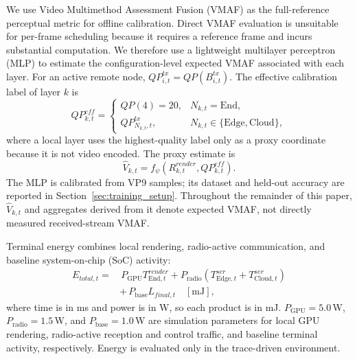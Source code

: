 \documentclass[10pt,journal,compsoc]{IEEEtran}
\begin{document}
We use Video Multimethod Assessment Fusion (VMAF) as the full-reference perceptual metric for offline calibration. Direct VMAF evaluation is unsuitable for per-frame scheduling because it requires a reference frame and incurs substantial computation. We therefore use a lightweight multilayer perceptron (MLP) to estimate the configuration-level expected VMAF associated with each layer. For an active remote node, $QP^{tx}_{i,t}=QP(B^{tx}_{i,t})$. The effective calibration label of layer $k$ is
\begin{equation}
	QP^{eff}_{k,t}=\begin{cases}
		QP(4)=20, & N_{k,t}=\mathrm{End},\\
		QP^{tx}_{N_{k,t},t}, & N_{k,t}\in\{\mathrm{Edge},\mathrm{Cloud}\},
	\end{cases}
	\label{eq:effective_qp}
\end{equation}
where a local layer uses the highest-quality label only as a proxy coordinate because it is not video encoded. The proxy estimate is
\begin{equation}
	\widehat V_{k,t}=f_{\psi}\!\left(R^{render}_{k,t},QP^{eff}_{k,t}\right).
	\label{eq:vmaf_proxy}
\end{equation}
The MLP is calibrated from VP9 samples; its dataset and held-out accuracy are reported in Section~\ref{sec:training_setup}. Throughout the remainder of this paper, $\widehat V_{k,t}$ and aggregates derived from it denote expected VMAF, not directly measured received-stream VMAF.

Terminal energy combines local rendering, radio-active communication, and baseline system-on-chip (SoC) activity:
\begin{equation}
\begin{aligned}
	E_{total,t}=&\,P_{\mathrm{GPU}}T^{render}_{\mathrm{End},t}
	+P_{\mathrm{radio}}\!\left(T^{ser}_{\mathrm{Edge},t}+T^{ser}_{\mathrm{Cloud},t}\right)\\
	&+\,P_{\mathrm{base}}L_{final,t}\quad[\mathrm{mJ}],
\end{aligned}
	\label{eq:energy_model}
\end{equation}
where time is in ms and power is in W, so each product is in mJ.
$P_{\mathrm{GPU}}=5.0$\,W, $P_{\mathrm{radio}}=1.5$\,W, and $P_{\mathrm{base}}=1.0$\,W are simulation parameters for local GPU rendering, radio-active reception and control traffic, and baseline terminal activity, respectively. Energy is evaluated only in the trace-driven environment.

\end{document}

